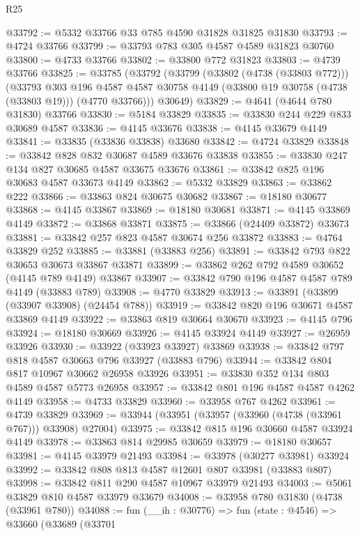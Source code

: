\begin{lexlean}{R25}
\begin{coremodule}
@33792 := @5332 @33766 @33 @785 @4590 @31828 @31825 @31830
@33793 := @4724 @33766
@33799 := @33793 @783 @305 @4587 @4589 @31823 @30760
@33800 := @4733 @33766
@33802 := @33800 @772 @31823
@33803 := @4739 @33766
@33825 := @33785
    (@33792
      (@33799
        (@33802 (@4738 (@33803 @772)))
        (@33793
          @303
          @196
          @4587
          @4587
          @30758
          @4149
          (@33800 @19 @30758 (@4738 (@33803 @19)))
          (@4770 @33766)))
      @30649)
@33829 := @4641 (@4644 @780 @31830) @33766
@33830 := @5184 @33829
@33835 := @33830 @244 @229 @833 @30689 @4587
@33836 := @4145 @33676
@33838 := @4145 @33679 @4149
@33841 := @33835 (@33836 @33838) @33680
@33842 := @4724 @33829
@33848 := @33842 @828 @832 @30687 @4589 @33676 @33838
@33855 := @33830 @247 @134 @827 @30685 @4587 @33675 @33676
@33861 := @33842 @825 @196 @30683 @4587 @33673 @4149
@33862 := @5332 @33829
@33863 := @33862 @222
@33866 := @33863 @824 @30675 @30682
@33867 := @18180 @30677
@33868 := @4145 @33867
@33869 := @18180 @30681
@33871 := @4145 @33869 @4149
@33872 := @33868 @33871
@33875 := @33866 (@24409 @33872) @33673
@33881 := @33842 @257 @823 @4587 @30674 @256 @33872
@33883 := @4764 @33829 @252
@33885 := @33881 (@33883 @256)
@33891 := @33842 @793 @822 @30653 @30673 @33867 @33871
@33899 := @33862 @262 @792 @4589 @30652 (@4145 @789 @4149) @33867
@33907 := @33842 @790 @196 @4587 @4587 @789 @4149 (@33883 @789)
@33908 := @4770 @33829
@33913 := @33891 (@33899 (@33907 @33908) (@24454 @788))
@33919 := @33842 @820 @196 @30671 @4587 @33869 @4149
@33922 := @33863 @819 @30664 @30670
@33923 := @4145 @796
@33924 := @18180 @30669
@33926 := @4145 @33924 @4149
@33927 := @26959 @33926
@33930 := @33922 (@33923 @33927) @33869
@33938 := @33842 @797 @818 @4587 @30663 @796 @33927 (@33883 @796)
@33944 := @33842 @804 @817 @10967 @30662 @26958 @33926
@33951 := @33830 @352 @134 @803 @4589 @4587 @5773 @26958
@33957 := @33842 @801 @196 @4587 @4587 @4262 @4149
@33958 := @4733 @33829
@33960 := @33958 @767 @4262
@33961 := @4739 @33829
@33969 := @33944 (@33951 (@33957 (@33960 (@4738 (@33961 @767))) @33908) @27004)
@33975 := @33842 @815 @196 @30660 @4587 @33924 @4149
@33978 := @33863 @814 @29985 @30659
@33979 := @18180 @30657
@33981 := @4145 @33979 @21493
@33984 := @33978 (@30277 @33981) @33924
@33992 := @33842 @808 @813 @4587 @12601 @807 @33981 (@33883 @807)
@33998 := @33842 @811 @290 @4587 @10967 @33979 @21493
@34003 := @5061 @33829 @810 @4587 @33979 @33679
@34008 := @33958 @780 @31830 (@4738 (@33961 @780))
@34088 := fun (__ih : @30776) =>
  fun (state : @4546) =>
  @33660
    (@33689
      (@33701

\end{coremodule}
\end{lexlean}
